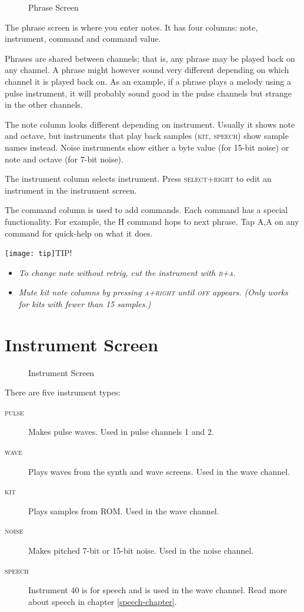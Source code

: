 \begin{figure}[hbtp]
\centering
{}
\caption{Phrase Screen}
\end{figure}

The phrase screen is where you enter notes. It has four columns: note, instrument, command and command value.

Phrases are shared between channels; that is, any phrase may be played back on any channel. A phrase might however sound very different depending on which channel it is played back on. As an example, if a phrase plays a melody using a pulse instrument, it will probably sound good in the pulse channels but strange in the other channels.

The note column looks different depending on instrument. Usually it shows note and octave, but instruments that play back samples (\textsc{kit}, \textsc{speech}) show sample names instead. Noise instruments show either a byte value (for 15-bit noise) or note and octave (for 7-bit noise).

The instrument column selects instrument. Press \textsc{select+right} to edit an instrument in the instrument screen.

The command column is used to add commands. Each command has a special functionality. For example, the H command hops to next phrase. Tap \textsc{A,A} on any command for quick-help on what it does.

\texttt{[image: tip]}TIP!
\begin{itemize}
    \item \textit{To change note without retrig, cut the instrument with \textsc{b+a}.}
    \item \textit{Mute kit note columns by pressing \textsc{a+right} until \textsc{off} appears. (Only works for kits with fewer than 15 samples.)}
\end{itemize}

\section{Instrument Screen}

\begin{figure}[hbtp]
\centering
{}
\caption{Instrument Screen}
\label{fig:instr2}
\end{figure}

There are five instrument types:

\begin{description}
\item[\textsc{pulse}] Makes pulse waves. Used in pulse channels 1 and 2.
\item[\textsc{wave}] Plays waves from the synth and wave screens. Used in the wave channel.
\item[\textsc{kit}] Plays samples from ROM. Used in the wave channel.
\item[\textsc{noise}] Makes pitched 7-bit or 15-bit noise. Used in the noise channel.
\item[\textsc{speech}] Instrument 40 is for speech and is used in the wave channel. Read more about speech in chapter \ref{speech-chapter}.
\end{description}

